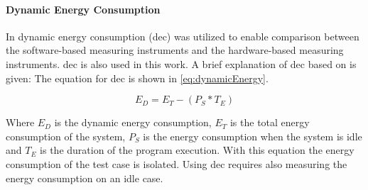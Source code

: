 \paragraph{Dynamic Energy Consumption}
In \cite{biksbois} dynamic energy consumption (dec) was utilized to enable comparison between the software-based measuring instruments and the hardware-based measuring instruments. dec is also used in this work. A brief explanation of dec based on \cite{biksbois} is given:
The equation for dec is shown in \cref{eq:dynamicEnergy}.

\begin{equation}\label{eq:dynamicEnergy}
    E_D = E_T - (P_S * T_E)
\end{equation}

Where $E_D$ is the dynamic energy consumption, $E_T$ is the total energy consumption of the system, $P_S$ is the energy consumption when the system is idle and $T_E$ is the duration of the program execution.\cite{biksbois} With this equation the energy consumption of the test case is isolated. Using dec requires also measuring the energy consumption on an idle case. 
